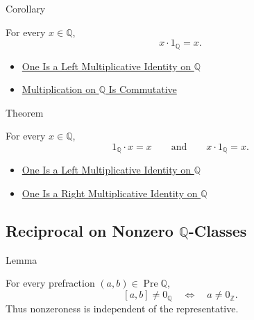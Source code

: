 \begin{corollarybox}{Corollary}
\begin{corollary}
\label{cor:one-right-multiplicative-identity-on-q}
For every $x\in\mathbb{Q}$,
\[
x\cdot 1_{\mathbb{Q}}=x.
\]
\end{corollary}
\end{corollarybox}

\begin{dependencies}
\begin{itemize}
  \item \hyperref[thm:one-left-multiplicative-identity-on-q]{One Is a Left Multiplicative Identity on $\mathbb{Q}$}
  \item \hyperref[thm:multiplication-on-q-commutative]{Multiplication on $\mathbb{Q}$ Is Commutative}
\end{itemize}
\end{dependencies}

\begin{theorembox}{Theorem}
\begin{theorem}
\label{thm:one-multiplicative-identity-on-q}
For every $x\in\mathbb{Q}$,
\[
1_{\mathbb{Q}}\cdot x=x
\qquad\text{and}\qquad
x\cdot 1_{\mathbb{Q}}=x.
\]
\end{theorem}
\end{theorembox}

\begin{dependencies}
\begin{itemize}
  \item \hyperref[thm:one-left-multiplicative-identity-on-q]{One Is a Left Multiplicative Identity on $\mathbb{Q}$}
  \item \hyperref[cor:one-right-multiplicative-identity-on-q]{One Is a Right Multiplicative Identity on $\mathbb{Q}$}
\end{itemize}
\end{dependencies}

\subsection*{Reciprocal on Nonzero $\mathbb{Q}$-Classes}

\begin{lemmabox}{Lemma}
\begin{lemma}
\label{lem:nonzero-predicate-well-defined-q}
For every prefraction $(a,b)\in\operatorname{Pre}\mathbb{Q}$,
\[
[a,b]\ne 0_{\mathbb{Q}}
\quad\Longleftrightarrow\quad
a\ne 0_{\mathbb{Z}}.
\]
Thus nonzeroness is independent of the representative.
\end{lemma}
\end{lemmabox}

